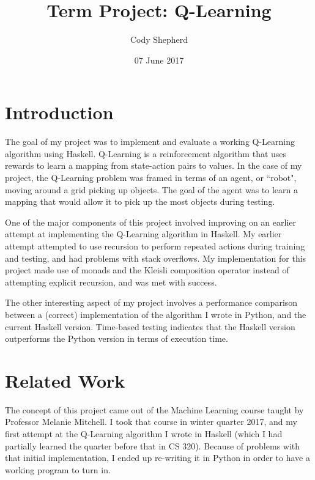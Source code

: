 \documentclass[12pt,a4paper]{article}
\title{Term Project: Q-Learning}
\date{07 June 2017}
\author{Cody Shepherd}
\begin{document}
\linespread{1.25}
\maketitle

\normalsize

	\section{Introduction}
	
	\par The goal of my project was to implement and evaluate a working Q-Learning algorithm using Haskell. Q-Learning is a reinforcement algorithm that uses rewards to learn a mapping from state-action pairs to values. In the case of my project, the Q-Learning problem was framed in terms of an agent, or ``robot", moving around a grid picking up objects. The goal of the agent was to learn a mapping that would allow it to pick up the most objects during testing.
	\par One of the major components of this project involved improving on an earlier attempt at implementing the Q-Learning algorithm in Haskell. My earlier attempt attempted to use recursion to perform repeated actions during training and testing, and had problems with stack overflows. My implementation for this project made use of monads and the Kleisli composition operator instead of attempting explicit recursion, and was met with success.
	\par The other interesting aspect of my project involves a performance comparison between a (correct) implementation of the algorithm I wrote in Python, and the current Haskell version. Time-based testing indicates that the Haskell version outperforms the Python version in terms of execution time.
	
	
	\section{Related Work}
	
	\par The concept of this project came out of the Machine Learning course taught by Professor Melanie Mitchell. I took that course in winter quarter 2017, and my first attempt at the Q-Learning algorithm I wrote in Haskell (which I had partially learned the quarter before that in CS 320). Because of problems with that initial implementation, I ended up re-writing it in Python in order to have a working program to turn in. 
	
\end{document}
